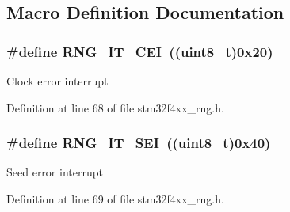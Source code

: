 \subsection{Macro Definition Documentation}
\hypertarget{group___r_n_g__interrupts__definition_ga8dabf5f116a92e59d18a224d14882927}{
\subsubsection[{R\-N\-G\-\_\-\-I\-T\-\_\-\-C\-E\-I}]{\setlength{\rightskip}{0pt plus 5cm}\#define R\-N\-G\-\_\-\-I\-T\-\_\-\-C\-E\-I~((uint8\-\_\-t)0x20)}}\label{group___r_n_g__interrupts__definition_ga8dabf5f116a92e59d18a224d14882927}
Clock error interrupt 

Definition at line 68 of file stm32f4xx\-\_\-rng.\-h.

\hypertarget{group___r_n_g__interrupts__definition_ga2343cb323912a036fa46b081bbe751bc}{
\subsubsection[{R\-N\-G\-\_\-\-I\-T\-\_\-\-S\-E\-I}]{\setlength{\rightskip}{0pt plus 5cm}\#define R\-N\-G\-\_\-\-I\-T\-\_\-\-S\-E\-I~((uint8\-\_\-t)0x40)}}\label{group___r_n_g__interrupts__definition_ga2343cb323912a036fa46b081bbe751bc}
Seed error interrupt 

Definition at line 69 of file stm32f4xx\-\_\-rng.\-h.


